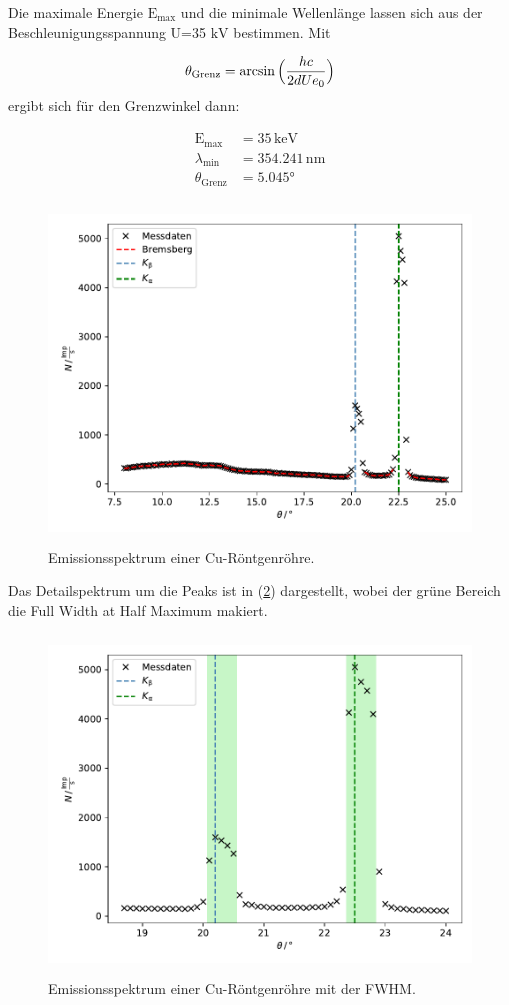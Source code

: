 \noindent
Die maximale Energie $\text{E}_\text{max}$ und die minimale Wellenlänge lassen sich aus der Beschleunigungsspannung U=35 $\si{\kilo\volt}$ bestimmen. 
Mit 

\begin{equation}
\theta_{\text{Grenz}} = \text{arcsin} \, \Bigl( \frac{hc}{2dUe_0} \Bigr)
\end{equation}   
\noindent
ergibt sich für den Grenzwinkel dann:

\begin{align*}
    \text{E}_\text{max} &= 35 \, \mathrm{keV}\\
    \lambda_\text{min} &= 354.241 \, \mathrm{nm}\\
    \theta_\text{Grenz} &= 5.045°
\end{align*}


\begin{figure}
    \centering
       \includegraphics[height=9cm]{daten/emissionsspektrum.pdf}
       \caption{Emissionsspektrum einer Cu-Röntgenröhre.}
       \label{fig:emi}
\end{figure}

\noindent
Das Detailspektrum um die Peaks ist in (\ref{fig:emi2}) dargestellt, wobei der grüne Bereich die Full Width at Half Maximum makiert.

\begin{figure}
    \centering
       \includegraphics[height=9cm]{daten/emissionsspektrum2.pdf}
       \caption{Emissionsspektrum einer Cu-Röntgenröhre mit der FWHM.}
       \label{fig:emi2}
\end{figure}

